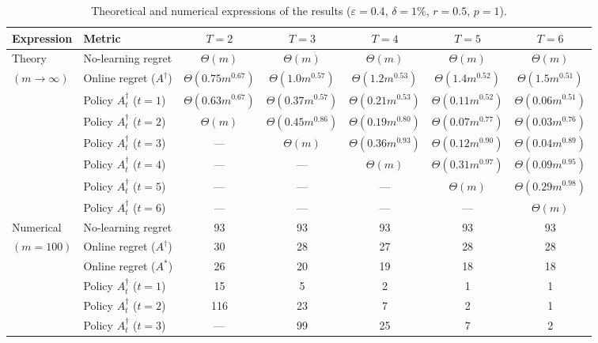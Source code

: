 \documentclass[blindrev]{informs3noheader}
\begin{document}
\begin{table}[h!]
\centering
\footnotesize\renewcommand{\arraystretch}{1.0}
\caption{Theoretical and numerical expressions of the results ($\varepsilon=0.4$, $\delta=1\%$, $r=0.5$, $p=1$).}
\label{tab:main}
\begin{tabular}{llccccc}
\toprule
Expression	&	Metric			&	$T=2$						&	$T=3$						&	$T=4	$						&	$T=5$						&	$T=6$						\\
\hline
Theory		&	No-learning regret	&	$\Theta(m)$			&	$\Theta(m)$			&	$\Theta(m)$			&	$\Theta(m)$			&	$\Theta(m)$			\\
$(m\to\infty)$	&	Online regret ($A^\dagger$)		&	$\Theta(0.75m^{0.67})$	&	$\Theta(1.0m^{0.57})$	&	$\Theta(1.2m^{0.53})$	&	$\Theta(1.4m^{0.52})$	&	$\Theta(1.5m^{0.51})$	\\
\cmidrule{2-7}
        &	Policy $A^\dagger_t$ ($t=1$)	&	$\Theta(0.63 m^{0.67})$	&	$\Theta(0.37 m^{0.57})$	&	$\Theta(0.21 m^{0.53})$	&	$\Theta(0.11 m^{0.52})$	&	$\Theta(0.06 m^{0.51})$	\\
        &	Policy $A^\dagger_t$ ($t=2$)	&	$\Theta(m)$					&	$\Theta(0.45 m^{0.86})$	&	$\Theta(0.19 m^{0.80})$	&	$\Theta(0.07 m^{0.77})$	&	$\Theta(0.03 m^{0.76})$	\\
        &	Policy $A^\dagger_t$ ($t=3$)	&	---							&	$\Theta(m)$					&	$\Theta(0.36 m^{0.93})$	&	$\Theta(0.12 m^{0.90})$	&	$\Theta(0.04 m^{0.89})$	\\
        &	Policy $A^\dagger_t$ ($t=4$)	&	---							&	---							&	$\Theta(m)$					&	$\Theta(0.31 m^{0.97})$	&	$\Theta(0.09 m^{0.95})$	\\
        &	Policy $A^\dagger_t$ ($t=5$)	&	---							&	---							&	---							&	$\Theta(m)$					&	$\Theta(0.29 m^{0.98})$	\\
        &	Policy $A^\dagger_t$ ($t=6$)	&	---							&	---							&	---							&	---							&	$\Theta(m)$					\\
\hline
Numerical	&	No-learning regret	&	93		&	93		&	93		&	93		&	93		\\
$(m=100)$	&	Online regret ($A^\dagger$)		&	30		&	28		&	27		&	28		&	28		\\
        &	Online regret ($A^*$)		&	26		&	20		&	19		&	18		&	18		\\
\cmidrule{2-7}
        &	Policy $A^\dagger_t$ ($t=1$)	&	15		&	5		&	2		&	1		&	1		\\
        &	Policy $A^\dagger_t$ ($t=2$)	&	116		&	23		&	7		&	2		&	1		\\
        &	Policy $A^\dagger_t$ ($t=3$)	&	---		&	99		&	25		&	7		&	2		\\

\end{tabular}
\end{table}
\end{document}
